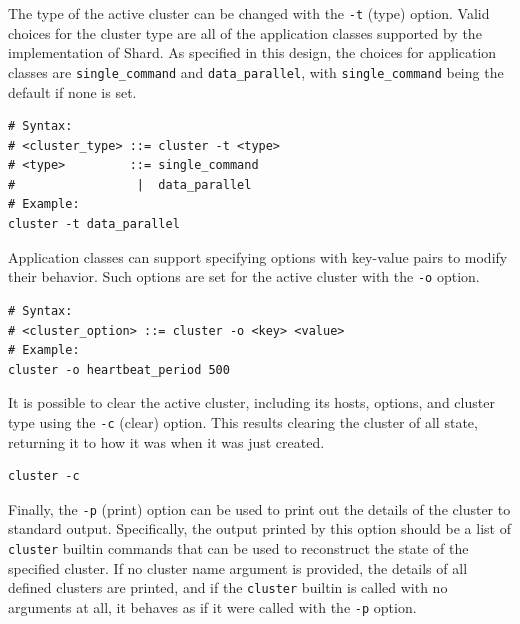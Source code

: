 \documentclass[twoside]{report}
\begin{document}
The type of the active cluster can be changed with the \texttt{-t} (type) option.
Valid choices for the cluster type are all of the application classes supported by the implementation of Shard.
As specified in this design, the choices for application classes are \texttt{single\_command} and \texttt{data\_parallel}, with \texttt{single\_command} being the default if none is set.

\begin{minipage}[c]{\textwidth-15pt}
  \begin{lstlisting}[language=Shard]
# Syntax:
# <cluster_type> ::= cluster -t <type>
# <type>         ::= single_command
#                 |  data_parallel
# Example:
cluster -t data_parallel
\end{lstlisting}
  \smallskip
\end{minipage}

Application classes can support specifying options with key-value pairs to modify their behavior. Such options are set for the active cluster with the \texttt{-o} option.

\begin{minipage}[c]{\textwidth-15pt}
  \begin{lstlisting}[language=Shard]
# Syntax:
# <cluster_option> ::= cluster -o <key> <value>
# Example:
cluster -o heartbeat_period 500
\end{lstlisting}
  \smallskip
\end{minipage}

It is possible to clear the active cluster, including its hosts, options, and cluster type using the \texttt{-c} (clear) option.
This results clearing the cluster of all state, returning it to how it was when it was just created.

\begin{minipage}[c]{\textwidth-15pt}
  \begin{lstlisting}[language=Shard]
cluster -c
\end{lstlisting}
  \smallskip
\end{minipage}

Finally, the \texttt{-p} (print) option can be used to print out the details of the cluster to standard output.
Specifically, the output printed by this option should be a list of \texttt{cluster} builtin commands that can be used to reconstruct the state of the specified cluster.
If no cluster name argument is provided, the details of all defined clusters are printed, and if the \texttt{cluster} builtin is called with no arguments at all, it behaves as if it were called with the \texttt{-p} option.
\end{document}
